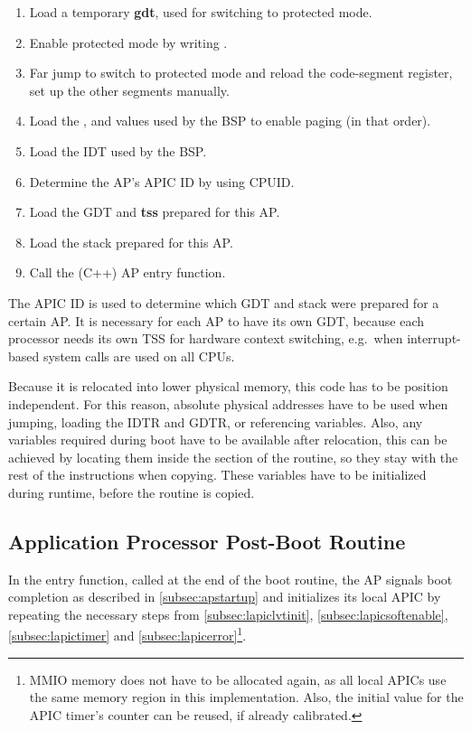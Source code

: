\begin{enumerate}
  \item Load a temporary \textbf{\gls{gdt}}, used for switching to protected mode.
  \item Enable protected mode by writing .
  \item Far jump to switch to protected mode and reload the code-segment register, set up the other segments manually.
  \item Load the ,  and  values used by the BSP to enable paging (in that order).
  \item Load the IDT used by the BSP\@.
  \item Determine the AP's APIC ID by using CPUID\@.
  \item Load the GDT and \textbf{\gls{tss}} prepared for this AP\@.
  \item Load the stack prepared for this AP\@.
  \item Call the (C++) AP entry function.
\end{enumerate}

The APIC ID is used to determine which GDT and stack were prepared for a certain AP\@.
It is necessary for each AP to have its own GDT, because each processor needs its own TSS for hardware context switching, e.g.\ when interrupt-based system calls are used on all CPUs.

Because it is relocated into lower physical memory, this code has to be position independent.
For this reason, absolute physical addresses have to be used when jumping, loading the IDTR and GDTR, or referencing variables.
Also, any variables required during boot have to be available after relocation, this can be achieved by locating them inside the  section of the routine, so they stay with the rest of the instructions when copying.
These variables have to be initialized during runtime, before the routine is copied.

\subsection{Application Processor Post-Boot Routine}
\label{subsec:apsystementry}

In the entry function, called at the end of the boot routine, the AP signals boot completion as described in \autoref{subsec:apstartup} and initializes its local APIC by repeating the necessary steps from \autoref{subsec:lapiclvtinit}, \autoref{subsec:lapicsoftenable}, \autoref{subsec:lapictimer} and \autoref{subsec:lapicerror}\footnote{
  MMIO memory does not have to be allocated again, as all local APICs use the same memory region in this implementation.
  Also, the initial value for the APIC timer's counter can be reused, if already calibrated.}.

